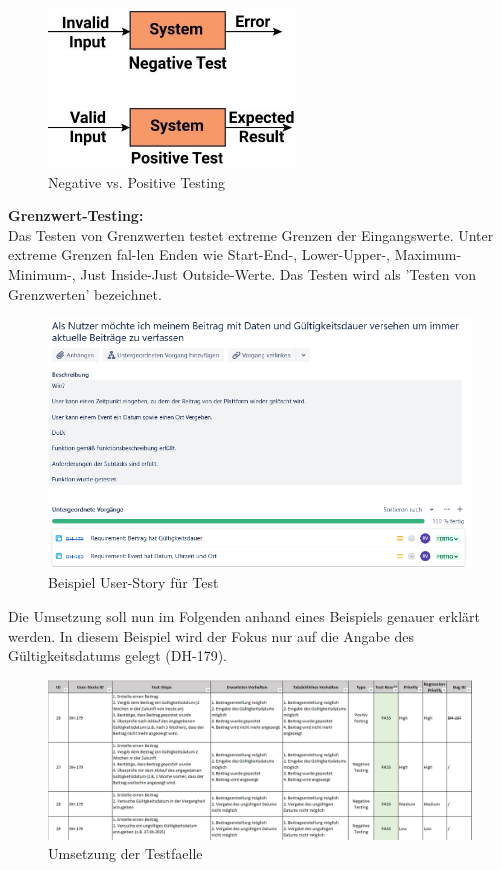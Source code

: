 \begin{figure}[!htb]
    \centering
    \includegraphics[width=.5\textwidth]{figures/rebecca/Neg_Pos_Testing.png}
    \caption[]{Negative vs. Positive Testing}
    \label{fig:negativ_vs_positiv_testing}
\end{figure}

\textbf{Grenzwert-Testing:} \\
Das Testen von Grenzwerten testet extreme Grenzen der Eingangswerte. Unter extreme Grenzen fal-len Enden wie Start-End-, Lower-Upper-, Maximum-Minimum-, Just Inside-Just Outside-Werte. Das Testen wird als 'Testen von Grenzwerten' bezeichnet.

\begin{figure}[!htb]
    \centering
    \includegraphics[width=.9\textwidth]{figures/rebecca/Beispiel_User_Story_Test.png}
    \caption[]{Beispiel User-Story für Test}
    \label{fig:BespielUserStory}
\end{figure}

Die Umsetzung soll nun im Folgenden anhand eines Beispiels genauer erklärt werden. In diesem Beispiel wird der Fokus nur auf die Angabe des Gültigkeitsdatums gelegt (DH-179).

\begin{figure}[!htb]
    \centering
    \includegraphics[width=.9\textwidth]{figures/rebecca/Umsetzung_Testfaelle}
    \caption[]{Umsetzung der Testfaelle}
    \label{fig:UmsetzungTestFaelle}
\end{figure}

